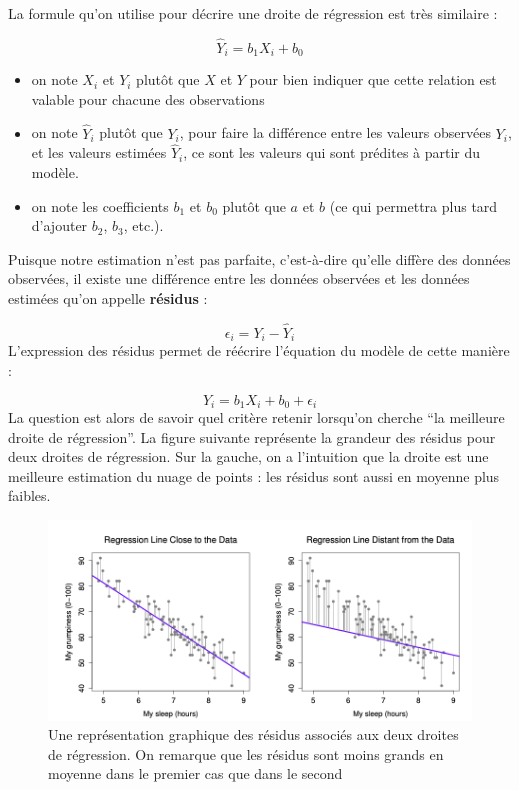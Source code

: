 \documentclass[
  french,
]{book}
\providecommand{\tightlist}{%
  \setlength{\itemsep}{0pt}\setlength{\parskip}{0pt}}
\begin{document}
La formule qu'on utilise pour décrire une droite de régression est très
similaire :

\[ \hat{Y}_i = b_1X_i + b_0\]

\begin{itemize}
\tightlist
\item
  on note \(X_i\) et \(Y_i\) plutôt que \(X\) et \(Y\) pour bien indiquer que cette relation est valable pour chacune des observations
\item
  on note \(\hat{Y}_i\) plutôt que \(Y_i\), pour faire la différence entre les valeurs observées \(Y_i\), et les valeurs estimées \(\hat{Y}_i\), ce sont les valeurs qui sont prédites à partir du modèle.
\item
  on note les coefficients \(b_1\) et \(b_0\) plutôt que \(a\) et \(b\) (ce qui permettra plus tard d'ajouter \(b_2\), \(b_3\), etc.).
\end{itemize}

Puisque notre estimation n'est pas parfaite, c'est-à-dire qu'elle
diffère des données observées, il existe une différence entre les
données observées et les données estimées qu'on appelle \textbf{résidus} :

\[ \epsilon_i = Y_i - \hat{Y}_i\]
L'expression des résidus permet de réécrire l'équation du modèle de cette manière :

\[ Y_i = b_1X_i + b_0 + \epsilon_i \]
La question est alors de savoir quel critère retenir lorsqu'on cherche ``la meilleure droite de régression''. La figure suivante représente la grandeur des résidus pour deux droites de régression. Sur la gauche, on a l'intuition que la droite est une meilleure estimation du nuage de points : les résidus sont aussi en moyenne plus faibles.

\begin{figure}
\includegraphics[width=12.44in]{images/residuals} \caption{Une représentation graphique des résidus associés aux deux droites de régression. On remarque que les résidus sont moins grands en moyenne dans le premier cas que dans le second}\label{fig:residus}
\end{figure}
\end{document}
